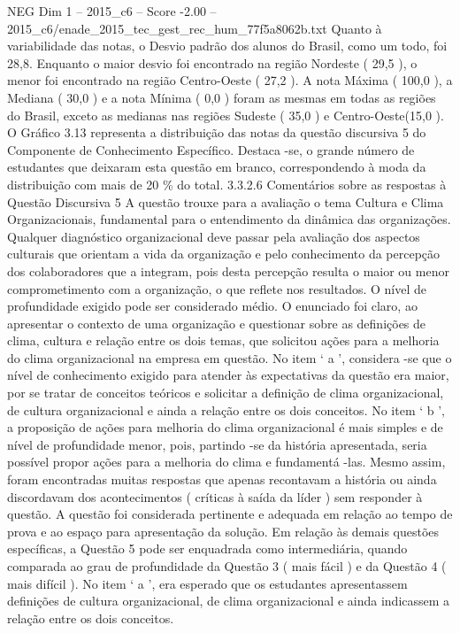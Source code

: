 \begin{textsample}{NEG Dim 1 – 2015\_c6 – Score -2.00 – 2015\_c6/enade\_2015\_tec\_gest\_rec\_hum\_77f5a8062b.txt}
Quanto à variabilidade das notas, o Desvio padrão dos alunos do Brasil, como um todo, foi 28,8.
Enquanto o maior desvio foi encontrado na região Nordeste ( 29,5 ), o menor foi encontrado na região Centro-Oeste ( 27,2 ).
A nota Máxima ( 100,0 ), a Mediana ( 30,0 ) e a nota Mínima ( 0,0 ) foram as mesmas em todas as regiões do Brasil, exceto as medianas nas regiões Sudeste ( 35,0 ) e Centro-Oeste(15,0 ).
O Gráfico 3.13 representa a distribuição das notas da questão discursiva 5 do Componente de Conhecimento Específico.
Destaca -se, o grande número de estudantes que deixaram esta questão em branco, correspondendo à moda da distribuição com mais de 20 \% do total. 3.3.2.6 Comentários sobre as respostas à Questão Discursiva 5 A questão trouxe para a avaliação o tema Cultura e Clima Organizacionais, fundamental para o entendimento da dinâmica das organizações.
Qualquer diagnóstico organizacional deve passar pela avaliação dos aspectos culturais que orientam a vida da organização e pelo conhecimento da percepção dos colaboradores que a integram, pois desta percepção resulta o maior ou menor comprometimento com a organização, o que reflete nos resultados.
O nível de profundidade exigido pode ser considerado médio.
O enunciado foi claro, ao apresentar o contexto de uma organização e questionar sobre as definições de clima, cultura e relação entre os dois temas, que solicitou ações para a melhoria do clima organizacional na empresa em questão.
No item ‘ a ’, considera -se que o nível de conhecimento exigido para atender às expectativas da questão era maior, por se tratar de conceitos teóricos e solicitar a definição de clima organizacional, de cultura organizacional e ainda a relação entre os dois conceitos.
No item ‘ b ’, a proposição de ações para melhoria do clima organizacional é mais simples e de nível de profundidade menor, pois, partindo -se da história apresentada, seria possível propor ações para a melhoria do clima e fundamentá -las.
Mesmo assim, foram encontradas muitas respostas que apenas recontavam a história ou ainda discordavam dos acontecimentos ( críticas à saída da líder ) sem responder à questão.
A questão foi considerada pertinente e adequada em relação ao tempo de prova e ao espaço para apresentação da solução.
Em relação às demais questões específicas, a Questão 5 pode ser enquadrada como intermediária, quando comparada ao grau de profundidade da Questão 3 ( mais fácil ) e da Questão 4 ( mais difícil ).
No item ‘ a ’, era esperado que os estudantes apresentassem definições de cultura organizacional, de clima organizacional e ainda indicassem a relação entre os dois conceitos.

\end{textsample}
